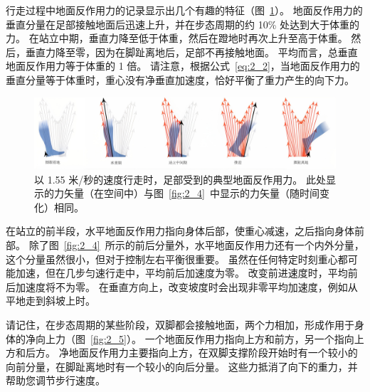 行走过程中地面反作用力的记录显示出几个有趣的特征（图~\ref{fig:2_6}）。
地面反作用力的垂直分量在足部接触地面后迅速上升，并在步态周期的约 10\% 处达到大于体重的力。
在站立中期，垂直力降至低于体重，然后在蹬地时再次上升至高于体重。
然后，垂直力降至零，因为在脚趾离地后，足部不再接触地面。
平均而言，总垂直地面反作用力等于体重的 1 倍。
请注意，根据公式~\ref{eq:2_2}，当地面反作用力的垂直分量等于体重时，重心没有净垂直加速度，恰好平衡了重力产生的向下力。

\begin{figure}[!htb]
	\centering
	\includegraphics[width=1.0\linewidth]{chap2/2_6}
	\caption{以 1.55 米/秒的速度行走时，足部受到的典型地面反作用力。
		此处显示的力矢量（在空间中）与图~\ref{fig:2_4}~中显示的力矢量（随时间变化）相同。 \label{fig:2_6}}
\end{figure}


在站立的前半段，水平地面反作用力指向身体后部，使重心减速，之后指向身体前部。
除了图~\ref{fig:2_4}~所示的前后分量外，水平地面反作用力还有一个内外分量，这个分量虽然很小，但对于控制左右平衡很重要。
虽然在任何特定时刻重心都可能加速，但在几步匀速行走中，平均前后加速度为零。
改变前进速度时，平均前后加速度将不为零。
在垂直方向上，改变坡度时会出现非零平均加速度，例如从平地走到斜坡上时。


请记住，在步态周期的某些阶段，双脚都会接触地面，两个力相加，形成作用于身体的净向上力（图~\ref{fig:2_5}）。
一个地面反作用力指向上方和前方，另一个指向上方和后方。
净地面反作用力主要指向上方，在双脚支撑阶段开始时有一个较小的向前分量，在脚趾离地时有一个较小的向后分量。
这些力抵消了向下的重力，并帮助您调节步行速度。


